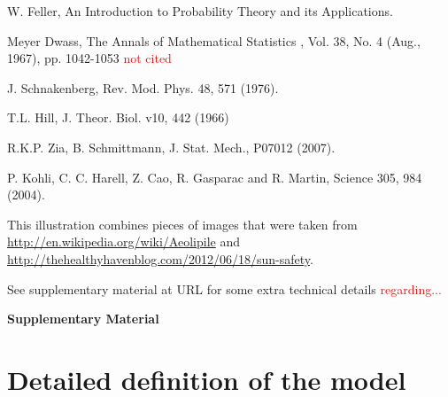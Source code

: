 \documentclass[aps,prl,floats,floatfix,twocolumn]{revtex4}
\newcommand{\rmrk}[1]{\textcolor{red}{#1}}
\begin{document}
\begin{thebibliography}{99}
W. Feller, 
An Introduction to Probability Theory and its Applications.

Meyer Dwass,
The Annals of Mathematical Statistics , Vol. 38, No. 4 (Aug., 1967), pp. 1042-1053
\rmrk{not cited}



J. Schnakenberg,
Rev. Mod. Phys. 48, 571 (1976).

T.L. Hill, 
J. Theor. Biol. v10, 442 (1966)

R.K.P. Zia, B. Schmittmann, 
J. Stat. Mech., P07012 (2007).

P. Kohli, C. C. Harell, Z. Cao, R. Gasparac and R. Martin, Science 305, 984 (2004).



This illustration combines pieces of images 
that were taken from \url{http://en.wikipedia.org/wiki/Aeolipile} 
and \url{http://thehealthyhavenblog.com/2012/06/18/sun-safety}.

See supplementary material at URL for some extra technical details \rmrk{regarding...}



\end{thebibliography}






\clearpage
\onecolumngrid

\begin{center}
{\LARGE\bf Supplementary Material}
\end{center}

\section{Detailed definition of the model}
\end{document}
